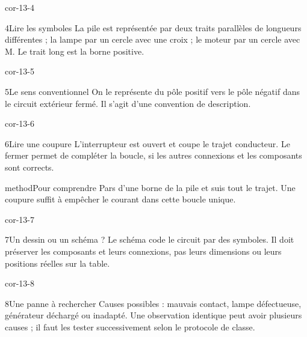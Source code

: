 \documentclass[12pt,twoside,openany]{book}
\begin{document}
\begin{blocLivre}{cor-13-4}
\begin{corrige}{4}{Lire les symboles}
La pile est représentée par deux traits parallèles de longueurs différentes ; la lampe par un cercle avec une croix ; le moteur par un cercle avec M. Le trait long est la borne positive.\par
{}
\end{corrige}\end{blocLivre}
\begin{blocLivre}{cor-13-5}
\begin{corrige}{5}{Le sens conventionnel}
On le représente du pôle positif vers le pôle négatif dans le circuit extérieur fermé. Il s’agit d’une convention de description.\par
{}
\end{corrige}\end{blocLivre}
\begin{blocLivre}{cor-13-6}
\begin{corrige}{6}{Lire une coupure}
L’interrupteur est ouvert et coupe le trajet conducteur. Le fermer permet de compléter la boucle, si les autres connexions et les composants sont corrects.\par
\begin{pcEncadre}{method}{Pour comprendre}
Pars d’une borne de la pile et suis tout le trajet. Une coupure suffit à empêcher le courant dans cette boucle unique.\par
\end{pcEncadre}
\end{corrige}\end{blocLivre}
\begin{blocLivre}{cor-13-7}
\begin{corrige}{7}{Un dessin ou un schéma ?}
Le schéma code le circuit par des symboles. Il doit préserver les composants et leurs connexions, pas leurs dimensions ou leurs positions réelles sur la table.\par
\end{corrige}\end{blocLivre}
\begin{blocLivre}{cor-13-8}
\begin{corrige}{8}{Une panne à rechercher}
Causes possibles : mauvais contact, lampe défectueuse, générateur déchargé ou inadapté. Une observation identique peut avoir plusieurs causes ; il faut les tester successivement selon le protocole de classe.\par
\end{corrige}\end{blocLivre}
\end{document}
